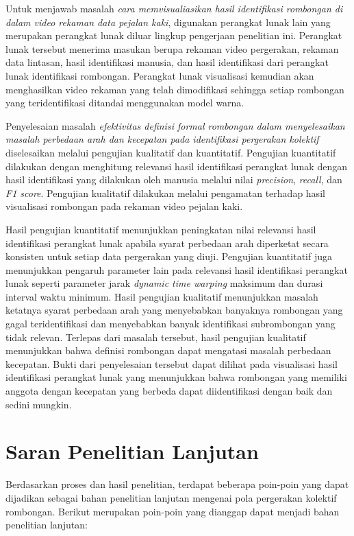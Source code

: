 Untuk menjawab masalah \textit{cara memvisualiasikan hasil identifikasi rombongan di dalam video rekaman data pejalan kaki}, digunakan perangkat lunak lain yang merupakan perangkat lunak diluar lingkup pengerjaan penelitian ini. Perangkat lunak tersebut menerima masukan berupa rekaman video pergerakan, rekaman data lintasan, hasil identifikasi manusia, dan hasil identifikasi dari perangkat lunak identifikasi rombongan. Perangkat lunak visualisasi kemudian akan menghasilkan video rekaman yang telah dimodifikasi sehingga setiap rombongan yang teridentifikasi ditandai menggunakan model warna.

Penyelesaian masalah \textit{efektivitas definisi formal rombongan dalam menyelesaikan masalah perbedaan arah dan kecepatan pada identifikasi pergerakan kolektif} diselesaikan melalui pengujian kualitatif dan kuantitatif. Pengujian kuantitatif dilakukan dengan menghitung relevansi hasil identifikasi perangkat lunak dengan hasil identifikasi yang dilakukan oleh manusia melalui nilai \textit{precision}, \textit{recall}, dan \textit{F1 score}. Pengujian kualitatif dilakukan melalui pengamatan terhadap hasil visualisasi rombongan pada rekaman video pejalan kaki.

Hasil pengujian kuantitatif menunjukkan peningkatan nilai relevansi hasil identifikasi perangkat lunak apabila syarat perbedaan arah diperketat secara konsisten untuk setiap data pergerakan yang diuji. Pengujian kuantitatif juga menunjukkan pengaruh parameter lain pada relevansi hasil identifikasi perangkat lunak seperti parameter jarak \textit{dynamic time warping} maksimum dan durasi interval waktu minimum. Hasil pengujian kualitatif menunjukkan masalah ketatnya syarat perbedaan arah yang menyebabkan banyaknya rombongan yang gagal teridentifikasi dan menyebabkan banyak identifikasi subrombongan yang tidak relevan. Terlepas dari masalah tersebut, hasil pengujian kualitatif menunjukkan bahwa definisi rombongan dapat mengatasi masalah perbedaan kecepatan. Bukti dari penyelesaian tersebut dapat dilihat pada visualisasi hasil identifikasi perangkat lunak yang menunjukkan bahwa rombongan yang memiliki anggota dengan kecepatan yang berbeda dapat diidentifikasi dengan baik dan sedini mungkin.

\section{Saran Penelitian Lanjutan}
\label{sec:saran}

Berdasarkan proses dan hasil penelitian, terdapat beberapa poin-poin yang dapat dijadikan sebagai bahan penelitian lanjutan mengenai pola pergerakan kolektif rombongan. Berikut merupakan poin-poin yang dianggap dapat menjadi bahan penelitian lanjutan:

